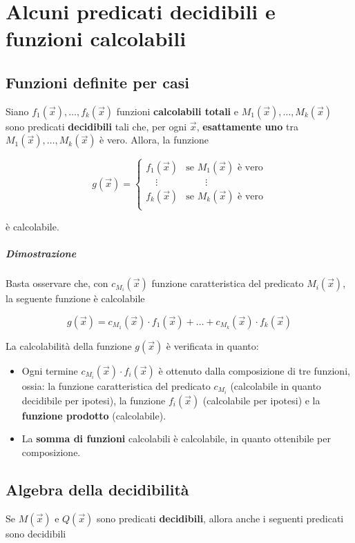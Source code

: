 \chapter{Alcuni predicati decidibili e funzioni calcolabili}
	
	\section{Funzioni definite per casi}
	
	Siano $f_1(\vec{x}), \dots, f_k(\vec{x})$ funzioni \textbf{calcolabili totali} e $M_1(\vec{x}), \dots ,M_k(\vec{x})$ sono predicati \textbf{decidibili} tali che, per ogni $\vec{x}$, \textbf{esattamente uno} tra $M_1(\vec{x}), \dots ,M_k(\vec{x})$ è vero. Allora, la funzione 
	
	$$
	g(\vec{x}) =
	\begin{cases}
		f_1(\vec{x}) & \text{se } M_1(\vec{x}) \text{ è vero} \\
		\quad \vdots & \qquad \vdots \\
		f_k(\vec{x}) & \text{se } M_k(\vec{x}) \text{ è vero}\\
	\end{cases}
	$$
	
	è calcolabile. 
	
	\paragraph{Dimostrazione}
	
	Basta osservare che, con $c_{M_i}(\vec{x})$ funzione caratteristica del predicato $M_i(\vec{x})$, la seguente funzione è calcolabile
	
	$$
	g(\vec{x}) = c_{M_1}(\vec{x})\cdot f_1(\vec{x}) + \dots + c_{M_k}(\vec{x})\cdot f_k(\vec{x})
	$$
	
	La calcolabilità della funzione $g(\vec x)$ è verificata in quanto:
	\begin{itemize}
		\item Ogni termine $c_{M_i}(\vec x) \cdot f_i(\vec x)$ è ottenuto dalla composizione di tre funzioni, ossia: la funzione caratteristica del predicato $c_{M_i}$ (calcolabile in quanto decidibile per ipotesi), la funzione $f_i(\vec x)$ (calcolabile per ipotesi) e la \textbf{funzione prodotto} (calcolabile).
		\item La \textbf{somma di funzioni} calcolabili è calcolabile, in quanto ottenibile per composizione.
	\end{itemize}
	
	\section{Algebra della decidibilità}
	Se $M(\vec{x})$ e $Q(\vec{x})$ sono predicati \textbf{decidibili}, allora anche i seguenti predicati sono decidibili
	
